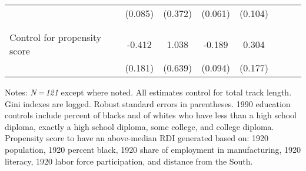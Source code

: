 \begin{table}[H]
{\begin{threeparttable}
\begin{tabular}{lccccccc}
            &     (0.085)         &     (0.372)         &     (0.061)         &     (0.104)         \\
\smallskip \\
\smallskip \\
Control for propensity score&      -0.412\sym{**} &       1.038         &      -0.189\sym{**} &       0.304\sym{*}  \\
            &     (0.181)         &     (0.639)         &     (0.094)         &     (0.177)         \\
\bottomrule[0.5pt]                                                                               \end{tabular}                                                                                                    \vspace{-2pt}                                                                                    \begin{tablenotes}[flushleft]{\setlength{\itemindent}{-3pt}}          \small                                                                        \item Notes: \textit{N = 121} except where noted. All estimates control for total track length. Gini indexes are logged. Robust standard errors in parentheses. 1990 education controls include percent of blacks and of whites who have less than a high school diploma, exactly a high school diploma, some college, and college diploma. Propensity score to have an above-median RDI generated based on: 1920 population, 1920 percent black, 1920 share of employment in manufacturing, 1920 literacy, 1920 labor force participation, and distance from the South.          \end{tablenotes}                                                                                         \end{threeparttable}                                                                             }                                                                                                                        \end{table}

